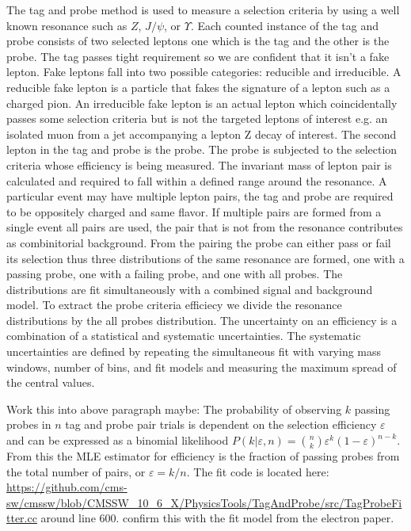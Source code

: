 The tag and probe method is used to measure a selection criteria by using a well known resonance such as $Z$, $J/\psi$, or $\Upsilon$. Each counted instance of the tag and probe consists of two selected leptons one which is the tag and the other is the probe.  The tag passes tight requirement so we are confident that it isn't a fake lepton. Fake leptons fall into two possible categories: reducible and irreducible. A reducible fake lepton is a particle that fakes the signature of a lepton such as a charged pion. An irreducible fake lepton is an actual lepton which coincidentally passes some selection criteria but is not the targeted leptons of interest e.g. an isolated muon from a jet accompanying a lepton Z decay of interest.  The  second lepton in the tag and probe is the probe. The probe is subjected to the selection criteria whose efficiency is being measured. The invariant mass of lepton pair is calculated and required to fall within a defined range around the resonance. A particular event may have multiple lepton pairs, the tag and probe are required to be oppositely charged and same flavor. If multiple pairs are formed from a single event all pairs are used, the pair that is not from the resonance contributes as combinitorial background. From the pairing the probe can either pass or fail its selection thus three distributions of the same resonance are formed, one with a passing probe, one with a failing probe, and one with all probes. The distributions are fit simultaneously with a combined signal and background model. To extract the probe criteria efficiecy we divide the resonance distributions by the all probes distribution. The uncertainty on an efficiency is a combination of a statistical and systematic uncertainties. The systematic uncertainties are defined by repeating the simultaneous fit with varying mass windows, number of bins, and fit models and measuring the maximum spread of the central values.

Work this into above paragraph maybe:
The probability of observing $k$ passing probes in $n$ tag and probe pair trials is dependent on the selection efficiency $\varepsilon$ and can be expressed as a binomial likelihood $P(k|\varepsilon,n) = \binom{n}{k}\varepsilon^k(1-\varepsilon)^{n-k}$. From this the MLE estimator for efficiency is the fraction of passing probes from the total number of pairs, or $\varepsilon = k/n$.
The fit code is located here: \url{https://github.com/cms-sw/cmssw/blob/CMSSW_10_6_X/PhysicsTools/TagAndProbe/src/TagProbeFitter.cc} around line 600. confirm this with the fit model from the electron paper. \cite{Berryhill_2010}

